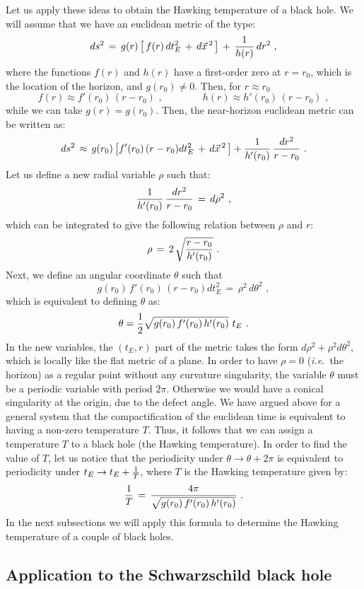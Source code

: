 \documentclass[12pt,notitlepage,a4paper]{article}
\newcommand{\beq}{\begin{equation}}
\newcommand{\eeq}{\end{equation}}
\def\ie{{\emph{i.e.}}}
\begin{document}
Let us apply these ideas to obtain the Hawking temperature of a black hole. 
We will assume that we have  an euclidean metric of the type:
\beq
ds^2\,=\,g(r)\,\big[\,f(r)\,dt_E^2\,+\,d\vec x^{\,2}\,\big]\,+\,{1\over h(r)}\,dr^2\,\,,
\label{general_BH_metric}
\eeq
where the functions $f(r)$ and $h(r)$ have a first-order zero at $r=r_0$, which is the location of the horizon, and  $g(r_0)\not=0$. Then, for $r\approx r_0$
\beq
f(r)\approx f'(r_0)\,(r-r_0)\,\,,
\qquad\qquad
h(r)\approx h'(r_0)\,(r-r_0)\,\,,
\eeq
while we can take $g(r)=g(r_0)$. Then, the near-horizon euclidean metric can be written as:
\beq
ds^2\,\approx\,g(r_0)\,\big[f'(r_0)\,(r-r_0) dt_E^2\,+\,d\vec x^{\,2}\,\big] +
{1\over h'(r_0)}\,{dr^2\over r-r_0}\,\,.
\eeq
Let us define a new radial variable $\rho$ such that:
\beq
{1\over h'(r_0)}\,{dr^2\over r-r_0}\,=\,d\rho^2\,\,,
\eeq
which can be integrated to give the following relation between $\rho$ and $r$:
\beq
\rho\,=\,2\,\sqrt{{r-r_0\over h'(r_0)}}\,\,.
\eeq
Next, we define an angular coordinate $\theta$ such that
\beq
g(r_0)\,f'(r_0)\,(r-r_0) dt_E^2\,=\,\rho^2\,d\theta^2\,\,,
\eeq
which is equivalent to defining $\theta$ as:
\beq
\theta={1\over 2}
\sqrt{g(r_0)\,f'(r_0)\,h'(r_0)}\,\,t_E\,\,.
\eeq
In the new variables, the $(t_E,r)$ part of the metric takes the form $d\rho^2+\rho^2 d\theta^2$, which is locally like the flat metric of a plane. In order to have $\rho=0$ (\ie\ the horizon) as a regular point without any curvature singularity, the variable  $\theta$ must be a periodic variable with period $2\pi$.  Otherwise we would have a conical singularity at the origin, due to the defect angle. We have argued  above  for a general system that the compactification of the euclidean time is equivalent to having a non-zero temperature $T$. Thus, it follows that we can assign a temperature $T$ to a black hole (the Hawking temperature). In order to find the value of $T$, let us notice that the periodicity under $\theta\to \theta+2\pi$ is equivalent to periodicity under $t_E\to t_E+{1\over T}$, where $T$ is the Hawking temperature given by:
\beq
{1\over T}\,=\,{4\pi\over \sqrt{g(r_0)\,f'(r_0)\,h'(r_0)}}\,\,.
\eeq
In the next subsections we will apply this formula to determine the Hawking temperature of a couple of black holes. 


\subsection{Application to the Schwarzschild black hole}
\end{document}
